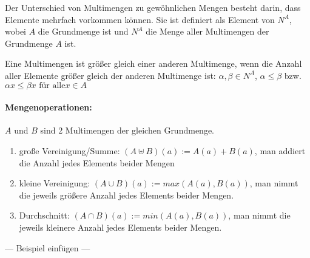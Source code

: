 Der Unterschied von Multimengen zu gewöhnlichen Mengen besteht darin,
dass Elemente mehrfach vorkommen können. Sie ist definiert als Element
von $N^A$, wobei $A$ die Grundmenge ist und $N^A$ die Menge aller
Multimengen der Grundmenge $A$ ist.

Eine Multimengen ist größer gleich einer anderen Multimenge, wenn die
Anzahl aller Elemente größer gleich der anderen Multimenge ist:
$\alpha, \beta \in N^A$, $\alpha \le \beta$ bzw. $\alpha x \le \beta x \text{ für alle
} x \in A$

\paragraph{Mengenoperationen:}
$A$ und $B$ sind 2 Multimengen der gleichen Grundmenge.
\begin{enumerate}
\item große Vereinigung/Summe: $(A \uplus B)(a) := A(a) + B(a)$, man
  addiert die Anzahl jedes Elements beider Mengen
\item kleine Vereinigung: $(A \cup B)(a) := max(A(a), B(a))$, man
  nimmt die jeweils größere Anzahl jedes Elements beider Mengen.
\item Durchschnitt: $(A \cap B)(a) := min(A(a), B(a))$, man nimmt die
  jeweils kleinere Anzahl jedes Elements beider Mengen.
\end{enumerate}

--- Beispiel einfügen ---

